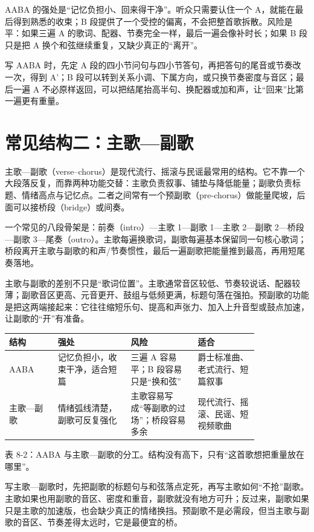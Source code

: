 AABA 的强处是“记忆负担小、回来得干净”。听众只需要认住一个 A，就能在最后得到熟悉的收束；B 段提供了一个受控的偏离，不会把整首歌拆散。风险是平：如果三遍 A 的歌词、配器、节奏完全一样，最后一遍会像补时长；如果 B 段只是把 A 换个和弦继续重复，又缺少真正的“离开”。

写 AABA 时，先定 A 段的四小节问句与四小节答句，再把答句的尾音或节奏改一次，得到 A'；B 段可以转到关系小调、下属方向，或只换节奏密度与音区；最后一遍 A 不必原样返回，可以把结尾抬高半句、换配器或加和声，让“回来”比第一遍更有重量。

\section{常见结构二：主歌—副歌}

主歌—副歌（verse--chorus）是现代流行、摇滚与民谣最常用的结构。它不靠一个大段落反复，而靠两种功能交替：主歌负责叙事、铺垫与降低能量；副歌负责标题、情绪高点与记忆点。二者之间常有一个预副歌（pre-chorus）做能量爬坡，后面可以接桥段（bridge）或间奏。

一个常见的八段骨架是：前奏（intro）—主歌 1—副歌 1—主歌 2—副歌 2—桥段—副歌 3—尾奏（outro）。主歌每遍换歌词，副歌每遍基本保留同一句核心歌词；桥段离开主歌与副歌的和声/节奏惯性，最后一遍副歌把能量推到最高，再用短尾奏落地。

主歌与副歌的差别不只是“歌词位置”。主歌通常音区较低、节奏较说话、配器较薄；副歌音区更高、元音更开、鼓组与低频更满，标题句落在强拍。预副歌的功能是把这两端接起来：它往往缩短乐句、提高和声张力、加入上升音型或鼓点加速，让副歌的“开”有准备。

\begin{center}
\small
\begin{tabular}{p{0.16\linewidth}p{0.24\linewidth}p{0.22\linewidth}p{0.20\linewidth}}
\toprule
结构 & 强处 & 风险 & 适合 \\
\midrule
AABA & 记忆负担小，收束干净，适合短篇 & 三遍 A 容易平；B 段容易只是“换和弦” & 爵士标准曲、老式流行、短篇叙事 \\
主歌—副歌 & 情绪弧线清楚，副歌可反复强化 & 主歌容易写成“等副歌的过场”；桥段容易多余 & 现代流行、摇滚、民谣、短视频歌曲 \\
\bottomrule
\end{tabular}

表 8-2：AABA 与主歌—副歌的分工。结构没有高下，只有“这首歌想把重量放在哪里”。
\end{center}

写主歌—副歌时，先把副歌的标题句与和弦落点定死，再写主歌如何“不抢”副歌。主歌如果也用副歌的音区、密度和重音，副歌就没有地方可升；反过来，副歌如果只是主歌的加速版，也会缺少真正的情绪换挡。预副歌不是必需段，但当主歌与副歌的音区、节奏差得太远时，它是最便宜的桥。



